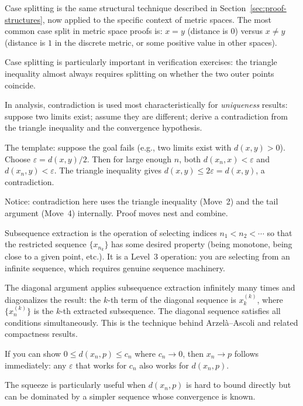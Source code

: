 \begin{remark}
Case splitting is the same structural technique described in
Section~\ref{sec:proof-structures}, now applied to the specific
context of metric spaces. The most common case split in metric space
proofs is: $x = y$ (distance is $0$) versus $x \neq y$ (distance
is $1$ in the discrete metric, or some positive value in other spaces).

Case splitting is particularly important in verification exercises:
the triangle inequality almost always requires splitting on whether
the two outer points coincide.
\end{remark}

\begin{remark}
In analysis, contradiction is used most characteristically for
\emph{uniqueness} results: suppose two limits exist; assume they are
different; derive a contradiction from the triangle inequality and the
convergence hypothesis.

The template: suppose the goal fails (e.g., two limits exist with
$d(x,y) > 0$). Choose $\varepsilon = d(x,y)/2$. Then for large enough
$n$, both $d(x_n, x) < \varepsilon$ and $d(x_n, y) < \varepsilon$.
The triangle inequality gives $d(x,y) \leq 2\varepsilon = d(x,y)$,
a contradiction.

Notice: contradiction here uses the triangle inequality (Move~2) and
the tail argument (Move~4) internally. Proof moves nest and combine.
\end{remark}

\begin{remark}
Subsequence extraction is the operation of selecting indices
$n_1 < n_2 < \cdots$ so that the restricted sequence
$\{x_{n_k}\}$ has some desired property (being monotone, being
close to a given point, etc.). It is a Level~3 operation: you are
selecting from an infinite sequence, which requires genuine sequence
machinery.

The diagonal argument applies subsequence extraction infinitely many
times and diagonalizes the result: the $k$-th term of the diagonal
sequence is $x_k^{(k)}$, where $\{x_n^{(k)}\}$ is the $k$-th
extracted subsequence. The diagonal sequence satisfies all conditions
simultaneously. This is the technique behind Arzel\`a--Ascoli and
related compactness results.
\end{remark}

\begin{remark}
If you can show $0 \leq d(x_n, p) \leq c_n$ where $c_n \to 0$, then
$x_n \to p$ follows immediately: any $\varepsilon$ that works for
$c_n$ also works for $d(x_n, p)$.

The squeeze is particularly useful when $d(x_n, p)$ is hard to bound
directly but can be dominated by a simpler sequence whose convergence
is known.
\end{remark}


